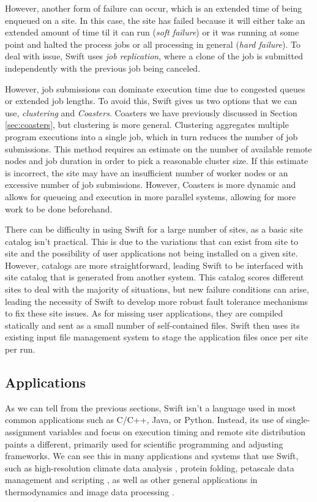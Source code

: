     However, another form of failure can occur, which is an extended time of being enqueued on a site. In this case, the site has failed because it will either take an extended amount of time til it can run (\textit{soft failure}) or it was running at some point and halted the process jobs or all processing in general (\textit{hard failure}). To deal with issue, Swift uses \textit{job replication}, where a clone of the job is submitted independently with the previous job being canceled.

    However, job submissions can dominate execution time due to congested queues or extended job lengths. To avoid this, Swift gives us two options that we can use, \textit{clustering} and \textit{Coasters}. Coasters we have previously discussed in Section \ref{sec:coasters}, but clustering is more general. Clustering aggregates multiple program executions into a single job, which in turn reduces the number of job submissions. This method requires an estimate on the number of available remote nodes and job duration in order to pick a reasonable cluster size. If this estimate is incorrect, the site may have an insufficient number of worker nodes or an excessive number of job submissions. However, Coasters is more dynamic and allows for queueing and execution in more parallel systems, allowing for more work to be done beforehand.

    There can be difficulty in using Swift for a large number of sites, as a basic site catalog isn't practical. This is due to the variations that can exist from site to site and the possibility of user applications not being installed on a given site. However, catalogs are more straightforward, leading Swift to be interfaced with site catalog that is generated from another system. This catalog scores different sites to deal with the majority of situations, but new failure conditions can arise, leading the necessity of Swift to develop more robust fault tolerance mechanisms to fix these site issues. As for missing user applications, they are compiled statically and sent as a small number of self-contained files. Swift then uses its existing input file management system to stage the application files once per site per run.

\subsection{Applications}

    As we can tell from the previous sections, Swift isn't a language used in most common applications such as C/C++, Java, or Python. Instead, its use of single-assignment variables and focus on execution timing and remote site distribution paints a different, primarily used for scientific programming and adjusting frameworks. We can see this in many applications and systems that use Swift, such as high-resolution climate data analysis \cite{woitaszek2011parallel}, protein folding, petascale data management and scripting \cite{wilde2009parallel}, as well as other general applications in thermodynamics and image data processing \cite{wilde2011swift}.

